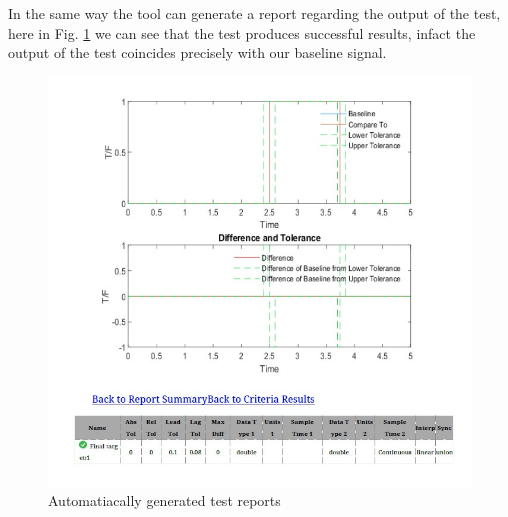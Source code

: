 \documentclass[12pt,a4paper]{report}
\begin{document}
In the same way the tool can generate a report regarding the output of the test, here in Fig. \ref{switch_baseline} we can see that the test produces successful results, infact the output of the test coincides precisely with our baseline signal. 
\begin{figure}[!h]
	\centering
	\includegraphics[scale=0.4]{switch_baseline.jpg}
	\caption{Automatiacally generated test reports}
	\label{switch_baseline}
\end{figure}
\FloatBarrier
\end{document}
